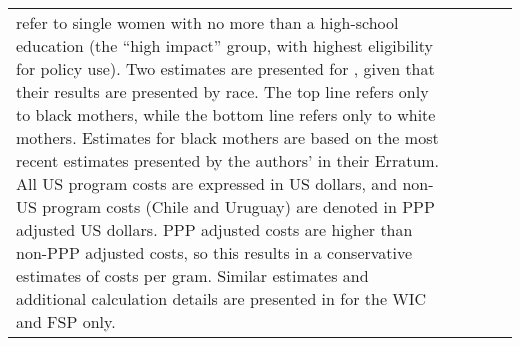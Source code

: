 \documentclass[12pt]{article}
\begin{document}
\begin{spacing}{1.4}
\begin{table}
\begin{tabular}{lcccc}
{{        \citet{Hoynesetal2015} refer to single women with no more than a
        high-school education (the ``high impact'' group, with highest
        eligibility for policy use). Two estimates are presented for
        \citet{Almondetal2011}, given that their results are presented by
        race.  The top line refers only to black mothers, while the bottom
        line refers only to white mothers.  Estimates for black mothers are
        based on the most recent estimates presented by the authors' in their
        Erratum.  All US program costs are expressed in US dollars, and
        non-US program costs (Chile and Uruguay) are denoted in PPP adjusted
        US dollars.  PPP adjusted costs are higher than non-PPP adjusted
        costs, so this results in a conservative estimates of costs per gram.
        Similar estimates and additional calculation details are presented in
        \citet{Clarkeetal2017} for the WIC and FSP only.}}\\
  \end{tabular}
\end{table}




\end{spacing}
\end{document}
